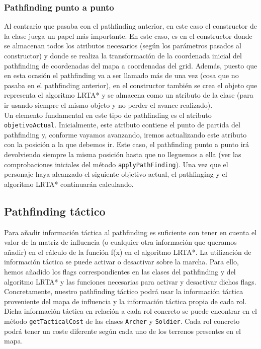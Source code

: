 \subsubsection{Pathfinding punto a punto}

Al contrario que pasaba con el pathfinding anterior, en este caso el constructor de la clase juega un papel más importante. En este caso, es en el constructor donde se almacenan todos los atributos necesarios (según los parámetros pasados al constructor) y donde se realiza la transformación de la coordenada inicial del pathfinding de coordenadas del mapa a coordenadas del grid. Además, puesto que en esta ocasión el pathfinding va a ser llamado más de una vez (cosa que no pasaba en el pathfinding anterior), en el constructor también se crea el objeto que representa el algoritmo LRTA* y se almacena como un atributo de la clase (para ir usando siempre el mismo objeto y no perder el avance realizado). \\

Un elemento fundamental en este tipo de pathfinding es el atributo \texttt{objetivoActual}. Inicialmente, este atributo contiene el punto de partida del pathfinding y, conforme vayamos avanzando, iremos actualizando este atributo con la posición a la que debemos ir. Este caso, el pathfinding punto a punto irá devolviendo siempre la misma posición hasta que no lleguemos a ella (ver las comprobaciones iniciales del método \texttt{applyPathFinding}). Una vez que el personaje haya alcanzado el siguiente objetivo actual, el pathfinging y el algoritmo LRTA* continuarán calculando.

\subsection{Pathfinding táctico}

Para añadir información táctica al pathfinding es suficiente con tener en cuenta el valor de la matriz de influencia (o cualquier otra información que queramos añadir) en el cálculo de la función f(x) en el algoritmo LRTA*. La utilización de información táctica se puede activar o desactivar sobre la marcha. Para ello, hemos añadido los flags correspondientes en las clases del pathfinding y del algoritmo LRTA* y las funciones necesarias para activar y desactivar dichos flags. \\

Concretamente, nuestro pathfinding táctico podrá usar la información táctica proveniente del mapa de influencia y la información táctica propia de cada rol. Dicha información táctica en relación a cada rol concreto se puede encontrar en el método \texttt{getTacticalCost} de las clases \texttt{Archer} y \texttt{Soldier}. Cada rol concreto podrá tener un coste diferente según cada uno de los terrenos presentes en el mapa.
